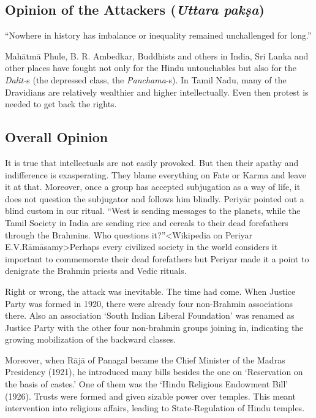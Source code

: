\subsection{Opinion of the Attackers (\textit{Uttara pakṣa})}

“Nowhere in history has imbalance or inequality remained unchallenged for long.”

Mahātmā Phule, B. R. Ambedkar, Buddhists and others in India, Sri Lanka and other places have fought not only for the Hindu untouchables but also for the \textit{Dalit-}s (the depressed class, the \textit{Panchama}-s). In Tamil Nadu, many of the Dravidians are relatively wealthier and higher intellectually. Even then protest is needed to get back the rights.


\subsection{Overall Opinion}

It is true that intellectuals are not easily provoked. But then their apathy and indifference is exasperating. They blame everything on Fate or Karma and leave it at that. Moreover, once a group has accepted subjugation as a way of life, it does not question the subjugator and follows him blindly. Periyār pointed out a blind custom in our ritual. “West is sending messages to the planets, while the Tamil Society in India are sending rice and cereals to their dead forefathers through the Brahmins. Who questions it?”\textless Wikipedia on Periyar E.V.Rāmāsamy\textgreater  Perhaps every civilized society in the world considers it important to commemorate their dead forefathers but Periyar made it a point to denigrate the Brahmin priests and Vedic rituals.

Right or wrong, the attack was inevitable. The time had come. When Justice Party was formed in 1920, there were already four non-Brahmin associations there. Also an association ‘South Indian Liberal Foundation’ was renamed as Justice Party with the other four non-brahmin groups joining in, indicating the growing mobilization of the backward classes.

Moreover, when Rājā of Panagal became the Chief Minister of the Madras Presidency (1921), he introduced many bills besides the one on ‘Reservation on the basis of castes.’ One of them was the ‘Hindu Religious Endowment Bill’ (1926). Trusts were formed and given sizable power over temples. This meant intervention into religious affairs, leading to State-Regulation of Hindu temples.

